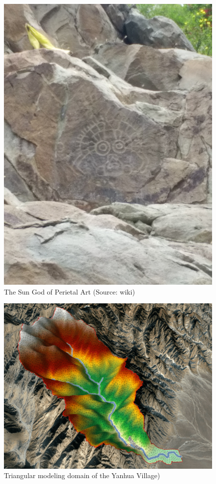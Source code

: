 \documentclass[
]{scrbook}
\begin{document}
\begin{figure}
\centering
\includegraphics{Fig/Example/Yanhuacun/sun.jpg}
\caption{The Sun God of Perietal Art (Source: wiki)}
\end{figure}

\begin{figure}
\centering
\includegraphics{Fig/Example/Yanhuacun/map.png}
\caption{Triangular modeling domain of the Yanhua Village)}
\end{figure}
\end{document}
